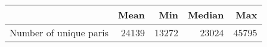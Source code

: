\begin{tabular}{lrrrr}
\toprule
{} &   Mean &    Min &  Median &    Max \\
\midrule
Number of unique paris &  24139 &  13272 &   23024 &  45795 \\
\bottomrule
\end{tabular}
